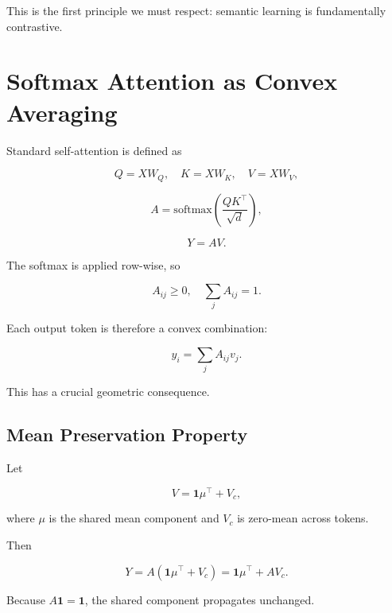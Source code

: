 This is the first principle we must respect:
semantic learning is fundamentally contrastive.

\section{Softmax Attention as Convex Averaging}

Standard self-attention is defined as

\begin{equation}
Q = XW_Q, \quad
K = XW_K, \quad
V = XW_V,
\end{equation}

\begin{equation}
A = \mathrm{softmax}\!\left(\frac{QK^\top}{\sqrt{d}}\right),
\end{equation}

\begin{equation}
Y = AV.
\end{equation}

The softmax is applied row-wise, so

\begin{equation}
A_{ij} \ge 0,
\quad
\sum_j A_{ij} = 1.
\end{equation}

Each output token is therefore a convex combination:

\begin{equation}
y_i = \sum_j A_{ij} v_j.
\end{equation}

This has a crucial geometric consequence.

\subsection{Mean Preservation Property}

Let

\begin{equation}
V = \mathbf{1}\mu^\top + V_c,
\end{equation}

where $\mu$ is the shared mean component
and $V_c$ is zero-mean across tokens.

Then

\begin{equation}
Y = A(\mathbf{1}\mu^\top + V_c)
=
\mathbf{1}\mu^\top + AV_c.
\end{equation}

Because $A\mathbf{1} = \mathbf{1}$,
the shared component propagates unchanged.

